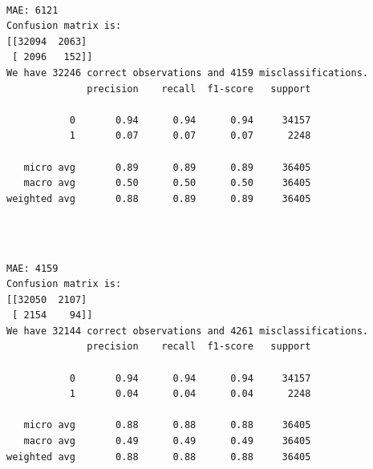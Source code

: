 \documentclass[8pt,onecolumn,aps,pra]{revtex4-1}
\begin{document}
    \begin{center}
    \end{center}
    { \hspace*{\fill} \\}
    
    \begin{Verbatim}[commandchars=\\\{\}]
MAE: 6121
Confusion matrix is:
[[32094  2063]
 [ 2096   152]]
We have 32246 correct observations and 4159 misclassifications.
              precision    recall  f1-score   support

           0       0.94      0.94      0.94     34157
           1       0.07      0.07      0.07      2248

   micro avg       0.89      0.89      0.89     36405
   macro avg       0.50      0.50      0.50     36405
weighted avg       0.88      0.89      0.89     36405


    \end{Verbatim}

    \begin{center}
    \end{center}
    { \hspace*{\fill} \\}
    
    \begin{Verbatim}[commandchars=\\\{\}]
MAE: 4159
Confusion matrix is:
[[32050  2107]
 [ 2154    94]]
We have 32144 correct observations and 4261 misclassifications.
              precision    recall  f1-score   support

           0       0.94      0.94      0.94     34157
           1       0.04      0.04      0.04      2248

   micro avg       0.88      0.88      0.88     36405
   macro avg       0.49      0.49      0.49     36405
weighted avg       0.88      0.88      0.88     36405


    \end{Verbatim}

    \begin{center}
    \end{center}
    { \hspace*{\fill} \\}
    
\end{document}
